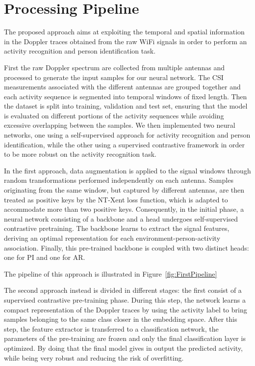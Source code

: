 
\section{Processing Pipeline}
The proposed approach aims at exploiting the temporal and spatial information in the Doppler traces obtained from the raw WiFi signals in order to perform an activity recognition and person identification task.

First the raw Doppler spectrum are collected from multiple antennas and processed to generate the input samples for our neural network. The CSI measurements associated with the different antennas are grouped together and each activity sequence is segmented into temporal windows of fixed length. Then the dataset is split into training, validation and test set, ensuring that the model is evaluated on different portions of the activity sequences while avoiding excessive overlapping between the samples. We then implemented two neural networks, one using a self-supervised approach for activity recognition and person identification, while the other using a supervised contrastive framework in order to be more robust on the activity recognition task.

In the first approach, data augmentation is applied to the signal windows through random transformations performed independently on each antenna. Samples originating from the same window, but captured by different antennas, are then treated as positive keys by the NT-Xent loss function, which is adapted to accommodate more than two positive keys. Consequently, in the initial phase, a neural network consisting of a backbone and a head undergoes self-supervised contrastive pretraining. The backbone learns to extract the signal features, deriving an optimal representation for each environment-person-activity association. Finally, this pre-trained backbone is coupled with two distinct heads: one for PI and one for AR.

The pipeline of this approach is illustrated in Figure~\ref{fig:FirstPipeline}

The second approach instead is divided in different stages: the first consist of a supervised contrastive pre-training phase. During this step, the network learns a compact representation of the Doppler traces by using the activity label to bring samples belonging to the same class closer in the embedding space. After this step, the feature extractor is transferred to a classification network, the parameters of the pre-training are frozen and only the final classification layer is optimized. By doing that the final model gives in output the predicted activity, while being very robust and reducing the risk of overfitting.

